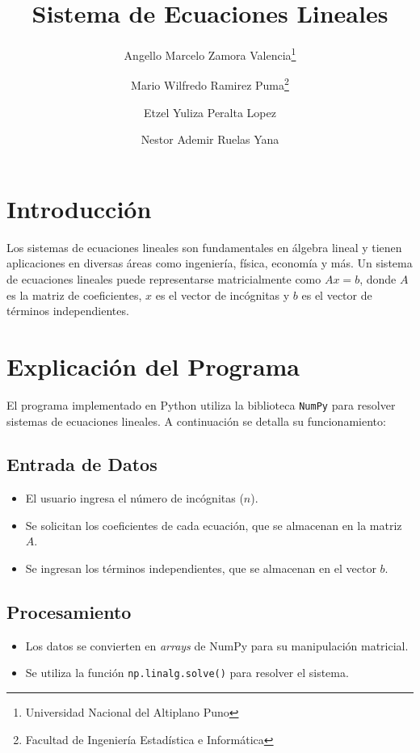 \documentclass[12pt]{article}
\title{Sistema de Ecuaciones Lineales}
\author{
	Angello Marcelo Zamora Valencia\thanks{Universidad Nacional del Altiplano Puno} \and 
	Mario Wilfredo Ramirez Puma\thanks{Facultad de Ingeniería Estadística e Informática} \and 
	Etzel Yuliza Peralta Lopez \and 
	Nestor Ademir Ruelas Yana
}
\date{} %
\begin{document}
	
	\maketitle
	
	\section{Introducción}
	
	Los sistemas de ecuaciones lineales son fundamentales en álgebra lineal y tienen aplicaciones en diversas áreas como ingeniería, física, economía y más. Un sistema de ecuaciones lineales puede representarse matricialmente como $Ax = b$, donde $A$ es la matriz de coeficientes, $x$ es el vector de incógnitas y $b$ es el vector de términos independientes.
	
	\section{Explicación del Programa}
	
	El programa implementado en Python utiliza la biblioteca \texttt{NumPy} para resolver sistemas de ecuaciones lineales. A continuación se detalla su funcionamiento:
	
	\subsection{Entrada de Datos}
	
	\begin{itemize}
		\item El usuario ingresa el número de incógnitas ($n$).
		\item Se solicitan los coeficientes de cada ecuación, que se almacenan en la matriz $A$.
		\item Se ingresan los términos independientes, que se almacenan en el vector $b$.
	\end{itemize}
	
	\subsection{Procesamiento}
	
	\begin{itemize}
		\item Los datos se convierten en \textit{arrays} de NumPy para su manipulación matricial.
		\item Se utiliza la función \texttt{np.linalg.solve()} para resolver el sistema.
	\end{itemize}
	
\end{document}
